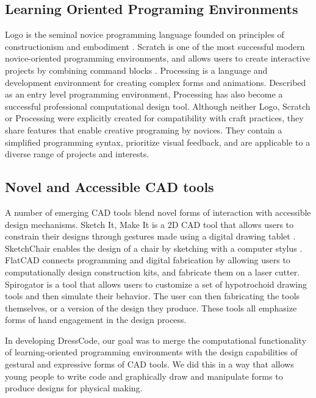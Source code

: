 \documentclass{sigchi}
\begin{document}
\subsection{Learning Oriented Programing Environments}
Logo is the seminal novice programming language founded on principles of constructionism and embodiment \cite{papert}. Scratch is one of the most successful modern novice-oriented programming environments, and allows users to create interactive projects by combining command blocks \cite{resnick2}. Processing is a language and development environment for creating complex forms and animations. Described as an entry level programming environment, Processing has also become a successful professional computational design tool\cite{processing}. Although neither Logo, Scratch or Processing were explicitly created for compatibility with craft practices, they share features that enable creative programing by novices. They contain a simplified programming syntax, prioritize visual feedback, and are applicable to a diverse range of projects and interests.
\subsection{Novel and Accessible CAD tools}
A number of emerging CAD tools blend novel forms of interaction with accessible design mechanisms. Sketch It, Make It is a 2D CAD tool that allows users to constrain their designs through gestures made using a digital drawing tablet \cite{sketchit}. SketchChair enables the design of a chair by sketching with a computer stylus \cite{sketchchair}. FlatCAD connects programming and digital fabrication by allowing users to computationally design construction kits, and fabricate them on a laser cutter\cite{flatcad}. Spirogator is a tool that allows users to customize a set of hypotrochoid drawing tools and then simulate their behavior. The user can then fabricating the tools themselves, or a version of the design they produce\cite{spirogator}. These tools all emphasize forms of hand engagement in the design process.

In developing DressCode, our goal was to merge the computational functionality of learning-oriented programming environments with the design capabilities of gestural and expressive forms of CAD tools. We did this in a way that allows young people to write code and graphically draw and manipulate forms to produce designs for physical making. 
\end{document}
